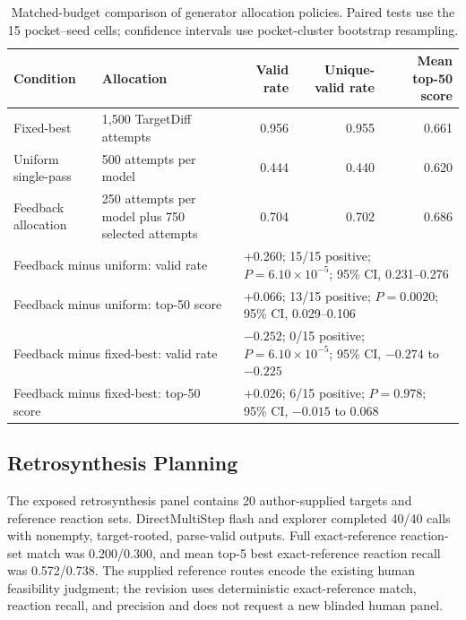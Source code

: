 \documentclass{article}
\begin{document}
\begin{table}[htbp]
\begingroup
\setlength{\tabcolsep}{3pt}
\centering
\scriptsize
\caption{Matched-budget comparison of generator allocation policies. Paired tests use the 15 pocket--seed cells; confidence intervals use pocket-cluster bootstrap resampling.}
\label{tab:sup-forge-gauge}
\begin{tabular}{lp{3.5cm}rrr}
\toprule
Condition & Allocation & Valid rate & Unique-valid rate & Mean top-50 score \\
\midrule
Fixed-best & 1,500 TargetDiff attempts & 0.956 & 0.955 & 0.661 \\
Uniform single-pass & 500 attempts per model & 0.444 & 0.440 & 0.620 \\
Feedback allocation & 250 attempts per model plus 750 selected attempts & 0.704 & 0.702 & 0.686 \\
\midrule
\multicolumn{2}{l}{Feedback minus uniform: valid rate} & \multicolumn{3}{l}{+0.260; 15/15 positive; $P=6.10\times10^{-5}$; 95\% CI, 0.231--0.276} \\
\multicolumn{2}{l}{Feedback minus uniform: top-50 score} & \multicolumn{3}{l}{+0.066; 13/15 positive; $P=0.0020$; 95\% CI, 0.029--0.106} \\
\multicolumn{2}{l}{Feedback minus fixed-best: valid rate} & \multicolumn{3}{l}{$-0.252$; 0/15 positive; $P=6.10\times10^{-5}$; 95\% CI, $-0.274$ to $-0.225$} \\
\multicolumn{2}{l}{Feedback minus fixed-best: top-50 score} & \multicolumn{3}{l}{+0.026; 6/15 positive; $P=0.978$; 95\% CI, $-0.015$ to 0.068} \\
\bottomrule
\end{tabular}
\endgroup
\end{table}

\subsection{Retrosynthesis Planning}

The exposed retrosynthesis panel contains 20 author-supplied targets and reference reaction sets. DirectMultiStep flash and explorer completed 40/40 calls with nonempty, target-rooted, parse-valid outputs. Full exact-reference reaction-set match was 0.200/0.300, and mean top-5 best exact-reference reaction recall was 0.572/0.738. The supplied reference routes encode the existing human feasibility judgment; the revision uses deterministic exact-reference match, reaction recall, and precision and does not request a new blinded human panel.
\end{document}
